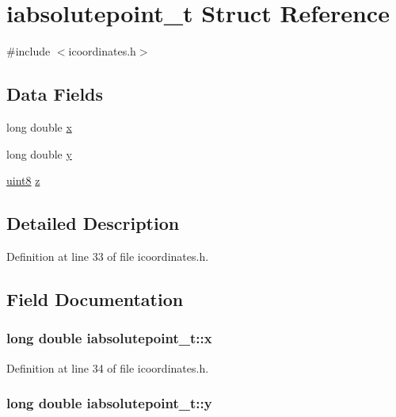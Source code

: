 \hypertarget{structiabsolutepoint__t}{\section{iabsolutepoint\-\_\-t Struct Reference}
\label{structiabsolutepoint__t}
}


{\ttfamily \#include $<$icoordinates.\-h$>$}

\subsection*{Data Fields}
\begin{DoxyCompactItemize}
\item 
long double \hyperlink{structiabsolutepoint__t_a7c546cbece73b64e924b982d1647005f}{x}
\item 
long double \hyperlink{structiabsolutepoint__t_a12ea188889c536abe1c6eba40dc62c39}{y}
\item 
\hyperlink{itypes_8h_adde6aaee8457bee49c2a92621fe22b79}{uint8} \hyperlink{structiabsolutepoint__t_a106b4f66e6ffbfcaa4f8c7fc428cc8d0}{z}
\end{DoxyCompactItemize}


\subsection{Detailed Description}


Definition at line 33 of file icoordinates.\-h.



\subsection{Field Documentation}
\hypertarget{structiabsolutepoint__t_a7c546cbece73b64e924b982d1647005f}{
\subsubsection[{x}]{\setlength{\rightskip}{0pt plus 5cm}long double iabsolutepoint\-\_\-t\-::x}}\label{structiabsolutepoint__t_a7c546cbece73b64e924b982d1647005f}


Definition at line 34 of file icoordinates.\-h.

\hypertarget{structiabsolutepoint__t_a12ea188889c536abe1c6eba40dc62c39}{
\subsubsection[{y}]{\setlength{\rightskip}{0pt plus 5cm}long double iabsolutepoint\-\_\-t\-::y}}\label{structiabsolutepoint__t_a12ea188889c536abe1c6eba40dc62c39}



